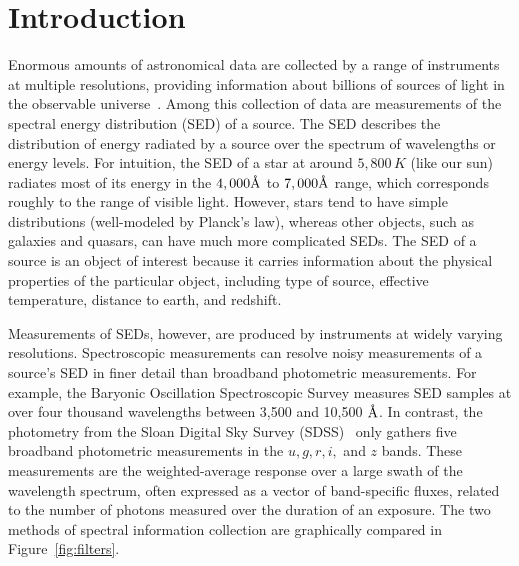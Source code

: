 \documentclass{article}
\newcommand{\angstrom}{\textup{\AA}}
\begin{document}
\section{Introduction}
Enormous amounts of astronomical data are collected by a range of instruments at multiple resolutions, providing information about billions of sources of light in the observable universe~\cite{kent1994sdss, martin2005galex}.  
Among this collection of data are measurements of the spectral energy distribution (SED) of a source.  
The SED describes the distribution of energy radiated by a source over the spectrum of wavelengths or energy levels.  
For intuition, the SED of a star at around $5,800\, K$ (like our sun) radiates most of its energy in the $4,000 \angstrom$ to $7,000\angstrom$ range, which corresponds roughly to the range of visible light.  
However, stars tend to have simple distributions (well-modeled by Planck's law), whereas other objects, such as galaxies and quasars, can have much more complicated SEDs.  
The SED of a source is an object of interest because it carries information about the physical properties of the particular object, including type of source, effective temperature, distance to earth, and redshift. 

Measurements of SEDs, however, are produced by instruments at widely varying resolutions.  
Spectroscopic measurements can resolve noisy measurements of a source's SED in finer detail than broadband photometric measurements.  For example, the Baryonic Oscillation Spectroscopic Survey \cite{dawson2013baryon} measures SED samples at over four thousand wavelengths between 3,500 and 10,500 $\angstrom$.
In contrast, the photometry from the Sloan Digital Sky Survey (SDSS)~\cite{kent1994sdss} only gathers five broadband photometric measurements in the $u,g,r,i,$ and $z$ bands.  These measurements are the weighted-average response over a large swath of the wavelength spectrum, often expressed as a vector of band-specific fluxes, related to the number of photons measured over the duration of an exposure.  
The two methods of spectral information collection are graphically compared in Figure~\ref{fig:filters}. 
\end{document}
